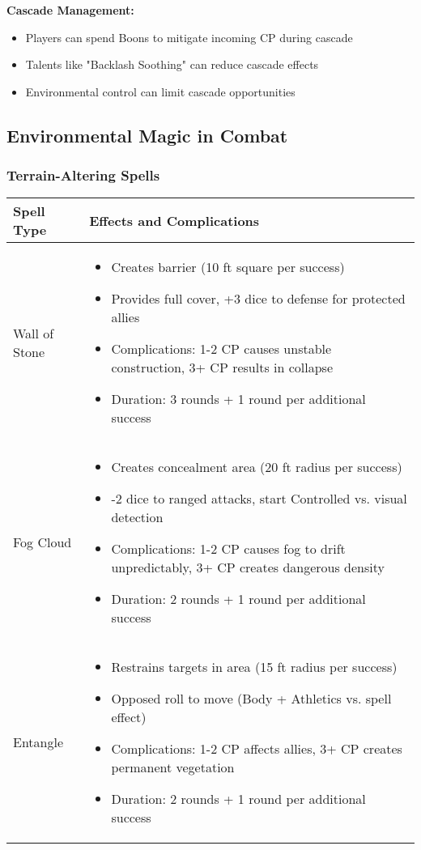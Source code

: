 \textbf{Cascade Management:}
\begin{itemize}[leftmargin=*]
    \item Players can spend Boons to mitigate incoming CP during cascade
    \item Talents like "Backlash Soothing" can reduce cascade effects
    \item Environmental control can limit cascade opportunities
\end{itemize}

\subsection{Environmental Magic in Combat}

\subsubsection{Terrain-Altering Spells}

\begin{longtable}{|>{\raggedright\arraybackslash}p{4cm}|>{\raggedright\arraybackslash}p{8cm}|}
\hline
\textbf{Spell Type} & \textbf{Effects and Complications} \\
\hline
Wall of Stone & 
\begin{itemize}
    \item Creates barrier (10 ft square per success)
    \item Provides full cover, +3 dice to defense for protected allies
    \item Complications: 1-2 CP causes unstable construction, 3+ CP results in collapse
    \item Duration: 3 rounds + 1 round per additional success
\end{itemize} \\
\hline
Fog Cloud & 
\begin{itemize}
    \item Creates concealment area (20 ft radius per success)
    \item -2 dice to ranged attacks, start Controlled vs. visual detection
    \item Complications: 1-2 CP causes fog to drift unpredictably, 3+ CP creates dangerous density
    \item Duration: 2 rounds + 1 round per additional success
\end{itemize} \\
\hline
Entangle & 
\begin{itemize}
    \item Restrains targets in area (15 ft radius per success)
    \item Opposed roll to move (Body + Athletics vs. spell effect)
    \item Complications: 1-2 CP affects allies, 3+ CP creates permanent vegetation
    \item Duration: 2 rounds + 1 round per additional success
\end{itemize} \\
\hline
\end{longtable}


